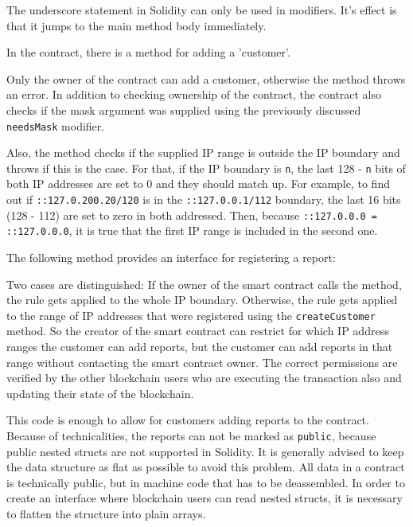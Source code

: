 The underscore statement in Solidity can only be used in modifiers. It's effect is that it jumps to the main method body immediately.

In the contract, there is a method for adding a 'customer'.



Only the owner of the contract can add a customer, otherwise the method throws an error. In addition to checking ownership of the contract, the contract also checks if the mask argument was supplied using the previously discussed \texttt{needsMask} modifier.

Also, the method checks if the supplied IP range is outside the IP boundary and throws if this is the case. For that, if the IP boundary is \texttt{n}, the last 128 - \texttt{n} bits of both IP addresses are set to 0 and they should match up. For example, to find out if \texttt{::127.0.200.20/120} is in the \texttt{::127.0.0.1/112} boundary, the last 16 bits (128 - 112) are set to zero in both addressed. Then, because \texttt{::127.0.0.0 = ::127.0.0.0}, it is true that the first IP range is included in the second one.

The following method provides an interface for registering a report:



Two cases are distinguished: If the owner of the smart contract calls the method, the rule gets applied to the whole IP boundary. Otherwise, the rule gets applied to the range of IP addresses that were registered using the \texttt{createCustomer} method. So the creator of the smart contract can restrict for which IP address ranges the customer can add reports, but the customer can add reports in that range without contacting the smart contract owner. The correct permissions are verified by the other blockchain users who are executing the transaction also and updating their state of the blockchain.

This code is enough to allow for customers adding reports to the contract. Because of technicalities, the reports can not be marked as \texttt{public}, because public nested structs are not supported in Solidity. It is generally advised to keep the data structure as flat as possible to avoid this problem.
All data in a contract is technically public, but in machine code that has to be deassembled. In order to create an interface where blockchain users can read nested structs, it is necessary to flatten the structure into plain arrays.

